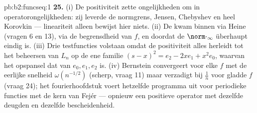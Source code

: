 \begin{solution}{pb:b2:funcseq:1}
\textbf{25.} (i) De positiviteit zette  ongelijkheden
om in operatorongelijkheden: zij leverde de normgrens, Jensen,
Chebyshev en heel Korovkin --- lineariteit alleen bewijst hier
niets. (ii) De  kwam binnen via Heine (vragen 6 en 13),
via de begrensdheid van $f$, en doordat de 
$\norm\cdot_\infty$ überhaupt eindig is. (iii) Drie testfuncties
volstaan omdat de positiviteit alles herleidt tot het beheersen van
$L_n$ op de ene familie $(s-x)^2 = e_2 - 2xe_1 + x^2e_0$, waarvan
het opspansel dat van $e_0, e_1, e_2$ is. (iv) Bernstein
convergeert voor elke  $f$ met de eerlijke snelheid
$\omega(n^{-1/2})$ (scherp, vraag 11) maar verzadigt bij $\frac1n$
voor gladde $f$ (vraag 24); het fourierhoofdstuk voert hetzelfde
programma uit voor periodieke functies met de kern van Fejér ---
opnieuw een positieve operator met dezelfde deugden en dezelfde
bescheidenheid.
\end{solution}
